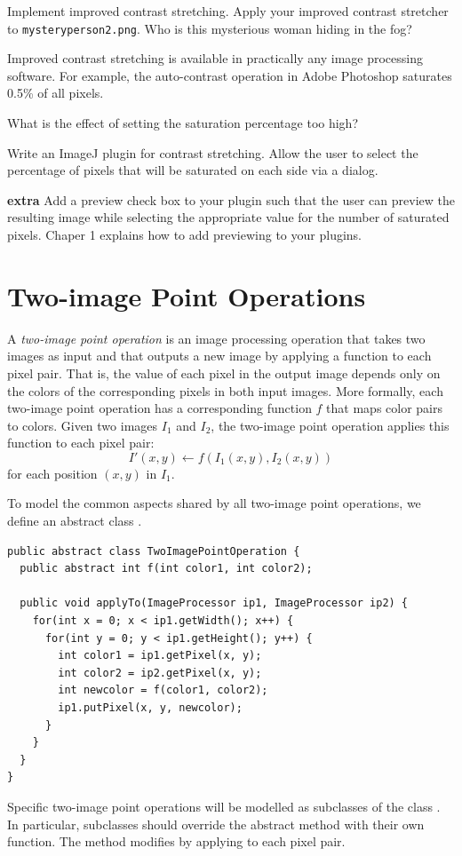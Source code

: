 \documentclass{book}
\begin{document}
\begin{exercise}
Implement improved contrast stretching. Apply your improved contrast stretcher to \texttt{mysteryperson2.png}.  Who is this mysterious woman hiding in the fog?
\end{exercise}

Improved contrast stretching is available in practically any image processing software. For example, the auto-contrast operation in Adobe Photoshop saturates 0.5\% of all pixels.

\begin{exercise}
What is the effect of setting the saturation percentage too high? 
\end{exercise}

\begin{exercise}
Write an ImageJ plugin for contrast stretching. Allow the user to select the percentage of pixels that will be saturated on each side via a dialog.
\end{exercise}

\begin{exercise}\textbf{extra}
Add a preview check box to your plugin such that the user can preview the resulting image while selecting the appropriate value for the number of saturated pixels. Chaper 1
explains how to add previewing to your plugins.
\end{exercise}

\section{Two-image Point Operations}
A \emph{two-image point operation} is an image processing operation that takes two images as input and that outputs a new image by applying a function to each pixel pair. That is, the value of each pixel in the output image depends only on the colors of the corresponding pixels in both input images. More formally, each two-image point operation has a corresponding function $f$ that maps color pairs to colors. Given two images $I_1$ and $I_2$, the two-image point operation applies this function to each pixel pair:
$$I'(x, y) \leftarrow f(I_1(x, y), I_2(x, y))$$
for each position $(x, y)$ in $I_1$.

To model the common aspects shared by all two-image point operations, we define an abstract class . 
\begin{lstlisting}
public abstract class TwoImagePointOperation {
  public abstract int f(int color1, int color2);
  
  public void applyTo(ImageProcessor ip1, ImageProcessor ip2) {
    for(int x = 0; x < ip1.getWidth(); x++) {
      for(int y = 0; y < ip1.getHeight(); y++) {
        int color1 = ip1.getPixel(x, y);
        int color2 = ip2.getPixel(x, y);
        int newcolor = f(color1, color2);
        ip1.putPixel(x, y, newcolor);
      }    
    }
  }
}
\end{lstlisting}
Specific two-image point operations will be modelled as subclasses of the class . In particular, subclasses should override the abstract method  with their own function. The method  modifies  by applying  to each pixel pair.
\end{document}
